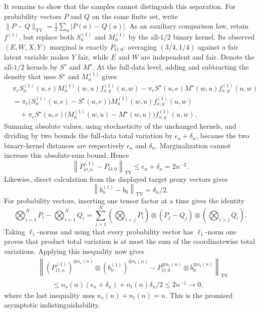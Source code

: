 It remains to show that the samples cannot distinguish this separation.  For probability vectors \(P\) and \(Q\) on the same finite set, write
\(\lVert P-Q\rVert_{\mathrm{TV}}=\frac12\sum_a|P(a)-Q(a)|\).
As an auxiliary comparison law, retain \(f^{(1)}\), but replace both \(S^{(1)}_n\) and \(M^{(1)}_n\) by the all-\(1/2\) binary kernel.  Its observed \((E,W,X,Y)\) marginal is exactly \(P_{O,0}\): averaging \((3/4,1/4)\) against a fair latent variable makes \(Y\) fair, while \(E\) and \(W\) are independent and fair.  Denote the all-\(1/2\) kernels by \(S^\star\) and \(M^\star\).  At the full-data level, adding and subtracting the density that uses \(S^\star\) and \(M^{(1)}_n\) gives
\[
\begin{split}
&\pi_eS^{(1)}_n(u,e)M^{(1)}_n(w,u)f^{(1)}_{x,y}(u,w)
-\pi_eS^\star(u,e)M^\star(w,u)f^{(1)}_{x,y}(u,w)\\
&=\pi_e\bigl(S^{(1)}_n(u,e)-S^\star(u,e)\bigr)
M^{(1)}_n(w,u)f^{(1)}_{x,y}(u,w)\\
&\quad+\pi_eS^\star(u,e)\bigl(M^{(1)}_n(w,u)-M^\star(w,u)\bigr)
f^{(1)}_{x,y}(u,w).
\end{split}
\]
Summing absolute values, using stochasticity of the unchanged kernels, and dividing by two bounds the full-data total variation by \(\epsilon_n+\delta_n\), because the two binary-kernel distances are respectively \(\epsilon_n\) and \(\delta_n\).  Marginalization cannot increase this absolute-sum bound.  Hence
\[
\left\lVert P^{(1)}_{O,n}-P_{O,0}\right\rVert_{\mathrm{TV}}
\le \epsilon_n+\delta_n=2n^{-2}.
\]
Likewise, direct calculation from the displayed target proxy vectors gives
\[
\left\lVert b^{(1)}_n-b_0\right\rVert_{\mathrm{TV}}=\delta_n/2.
\]
For probability vectors, inserting one tensor factor at a time gives the identity
\[
\bigotimes_{i=1}^N P_i-\bigotimes_{i=1}^N Q_i
=\sum_{j=1}^N
\left(\bigotimes_{i<j}P_i\right)\otimes(P_j-Q_j)\otimes
\left(\bigotimes_{i>j}Q_i\right).
\]
Taking \(\ell_1\)-norms and using that every probability vector has \(\ell_1\)-norm one proves that product total variation is at most the sum of the coordinatewise total variations.  Applying this inequality now gives
\[
\begin{split}
&\left\lVert
(P^{(1)}_{O,n})^{\otimes n_s(n)}\otimes(b^{(1)}_n)^{\otimes n_t(n)}
-P_{O,0}^{\otimes n_s(n)}\otimes b_0^{\otimes n_t(n)}
\right\rVert_{\mathrm{TV}}\\
&\qquad\le n_s(n)(\epsilon_n+\delta_n)+n_t(n)\delta_n/2
\le 2n^{-1}\longrightarrow0,
\end{split}
\]
where the last inequality uses \(n_s(n)+n_t(n)=n\).  This is the promised asymptotic indistinguishability.


